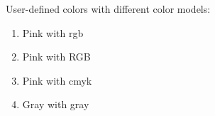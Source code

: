 \documentclass{article}
\begin{document}
	User-defined colors with different color models:
	
	\begin{enumerate}
		\item \textcolor{mypink1}{Pink with rgb}
		\item \textcolor{mypink2}{Pink with RGB}
		\item \textcolor{mypink3}{Pink with cmyk}
		\item \textcolor{mygray}{Gray with gray}
	\end{enumerate}
\end{document}
